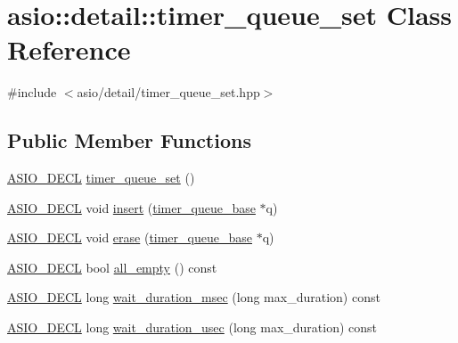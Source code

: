 \hypertarget{classasio_1_1detail_1_1timer__queue__set}{}\section{asio\+:\+:detail\+:\+:timer\+\_\+queue\+\_\+set Class Reference}
\label{classasio_1_1detail_1_1timer__queue__set}


{\ttfamily \#include $<$asio/detail/timer\+\_\+queue\+\_\+set.\+hpp$>$}

\subsection*{Public Member Functions}
\begin{DoxyCompactItemize}
\item 
\hyperlink{config_8hpp_ab54d01ea04afeb9a8b39cfac467656b7}{A\+S\+I\+O\+\_\+\+D\+E\+C\+L} \hyperlink{classasio_1_1detail_1_1timer__queue__set_abc3df45cac708813320ac57f820029af}{timer\+\_\+queue\+\_\+set} ()
\item 
\hyperlink{config_8hpp_ab54d01ea04afeb9a8b39cfac467656b7}{A\+S\+I\+O\+\_\+\+D\+E\+C\+L} void \hyperlink{classasio_1_1detail_1_1timer__queue__set_a5bcc7d13fd4c405869d5d724efa0740d}{insert} (\hyperlink{classasio_1_1detail_1_1timer__queue__base}{timer\+\_\+queue\+\_\+base} $\ast$q)
\item 
\hyperlink{config_8hpp_ab54d01ea04afeb9a8b39cfac467656b7}{A\+S\+I\+O\+\_\+\+D\+E\+C\+L} void \hyperlink{classasio_1_1detail_1_1timer__queue__set_a56051939eb368baea53c67ad1c051176}{erase} (\hyperlink{classasio_1_1detail_1_1timer__queue__base}{timer\+\_\+queue\+\_\+base} $\ast$q)
\item 
\hyperlink{config_8hpp_ab54d01ea04afeb9a8b39cfac467656b7}{A\+S\+I\+O\+\_\+\+D\+E\+C\+L} bool \hyperlink{classasio_1_1detail_1_1timer__queue__set_ae591d781cbff1811fb1f093c10b74b7b}{all\+\_\+empty} () const 
\item 
\hyperlink{config_8hpp_ab54d01ea04afeb9a8b39cfac467656b7}{A\+S\+I\+O\+\_\+\+D\+E\+C\+L} long \hyperlink{classasio_1_1detail_1_1timer__queue__set_a21f8058541fc2f63f3e4318139d9ce1c}{wait\+\_\+duration\+\_\+msec} (long max\+\_\+duration) const 
\item 
\hyperlink{config_8hpp_ab54d01ea04afeb9a8b39cfac467656b7}{A\+S\+I\+O\+\_\+\+D\+E\+C\+L} long \hyperlink{classasio_1_1detail_1_1timer__queue__set_a0b80b1337af67254415e13dcbf2b39c0}{wait\+\_\+duration\+\_\+usec} (long max\+\_\+duration) const 
\item 

\end{DoxyCompactItemize}

